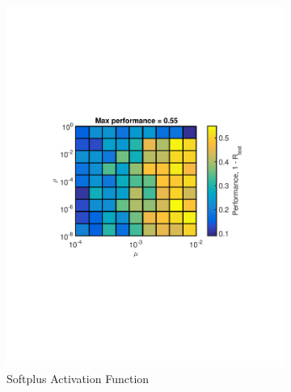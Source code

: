 \documentclass[journal,a4paper,onecolumn,11pt]{IEEEtran}
\begin{document}
\begin{figure}[!h] 
	\centering
	\begin{subfigure}{.5\textwidth}
		\centering
		\includegraphics[width=\textwidth]{Opt_sp_digit.pdf}
		\caption{Softplus Activation Function}
		\label{fig:Opt_sp_digit}
	\end{subfigure}%
	\begin{subfigure}{.5\textwidth}
		\centering

\end{subfigure}
\end{figure}
\end{document}

